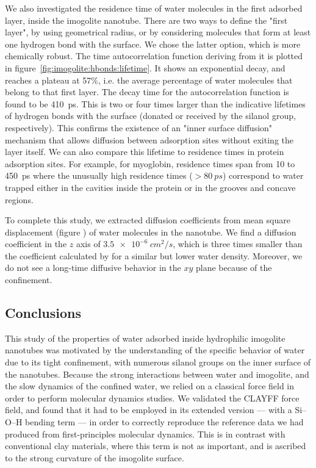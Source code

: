 \documentclass[thesis]{subfiles}
\begin{document}
We also investigated the residence time of water molecules in the first adsorbed
layer, inside the imogolite nanotube. There are two ways to define the "first
layer", by using geometrical radius, or by considering molecules that form at
least one hydrogen bond with the surface. We chose the latter option, which is
more chemically robust. The time autocorrelation function deriving from it is
plotted in figure~\ref{fig:imogolite:hbonds:lifetime}. It shows an exponential decay, and
reaches a plateau at 57\%, i.e. the average percentage of water molecules that
belong to that first layer. The decay time for the autocorrelation function is
found to be \SI{410}{ps}. This is two or four times larger than the indicative
lifetimes of hydrogen bonds with the surface (donated or received by the silanol
group, respectively). This confirms the existence of an "inner surface
diffusion" mechanism that allows diffusion between adsorption sites without
exiting the layer itself. We can also compare this lifetime to residence times
in protein adsorption sites. For example, for myoglobin\cite{Makarov2000},
residence times span from 10 to \SI{450}{ps} where the unusually high residence
times ($> \SI{80}{ps}$) correspond to water trapped either in the cavities
inside the protein or in the grooves and concave regions.

To complete this study, we extracted diffusion coefficients from mean square
displacement (figure \TODO) of water molecules in the nanotube. We find a diffusion
coefficient in the $z$ axis of $\SI{3.5e-6}{cm^2/s}$, which is three times
smaller than the coefficient calculated by \citeauthor{Zang2009}\cite{Zang2009}
for a similar but lower water density. Moreover, we do not see a long-time
diffusive behavior in the $xy$ plane because of the confinement.

\subsection{Conclusions}

This study of the properties of water adsorbed inside hydrophilic imogolite
nanotubes was motivated by the understanding of the specific behavior of water
due to its tight confinement, with numerous silanol groups on the inner surface
of the nanotubes. Because the strong interactions between water and imogolite,
and the slow dynamics of the confined water, we relied on a classical force
field in order to perform molecular dynamics studies. We validated the CLAYFF
force field, and found that it had to be employed in its extended version ---
with a Si--O--H bending term --- in order to correctly reproduce the reference
data we had produced from first-principles molecular dynamics. This is in
contrast with conventional clay materials, where this term is not as important,
and is ascribed to the strong curvature of the imogolite surface.
\end{document}
